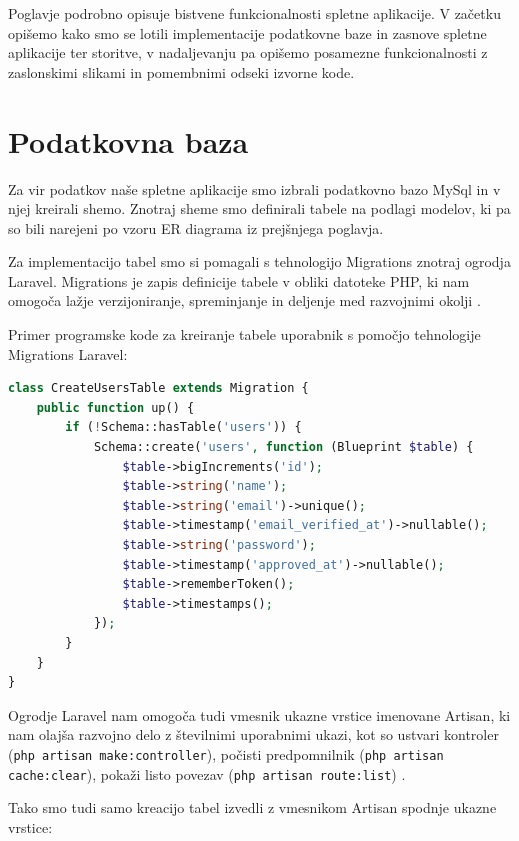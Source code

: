 \documentclass[a4paper, 12pt]{book}
\begin{document}
Poglavje podrobno opisuje bistvene funkcionalnosti spletne aplikacije. V začetku opišemo kako smo se lotili implementacije podatkovne baze in zasnove spletne aplikacije ter storitve, v nadaljevanju pa opišemo posamezne funkcionalnosti z zaslonskimi slikami in pomembnimi odseki izvorne kode.


\section{Podatkovna baza}

Za vir podatkov naše spletne aplikacije smo izbrali podatkovno bazo MySql in v njej kreirali shemo. Znotraj sheme smo definirali tabele na podlagi modelov, ki pa so bili narejeni po vzoru ER diagrama iz prejšnjega poglavja.
 
Za implementacijo tabel smo si pomagali s tehnologijo Migrations znotraj ogrodja Laravel. Migrations je zapis definicije tabele v obliki datoteke PHP, ki nam omogoča lažje verzijoniranje, spreminjanje in deljenje med razvojnimi okolji \cite{laravel-migrations}.

\clearpage

Primer programske kode za kreiranje tabele uporabnik s pomočjo tehnologije Migrations Laravel:

\begin{lstlisting}[language=PHP, style=mystyle]
class CreateUsersTable extends Migration {
    public function up() {
        if (!Schema::hasTable('users')) {
            Schema::create('users', function (Blueprint $table) {
                $table->bigIncrements('id');
                $table->string('name');
                $table->string('email')->unique();
                $table->timestamp('email_verified_at')->nullable();
                $table->string('password');
                $table->timestamp('approved_at')->nullable();
                $table->rememberToken();
                $table->timestamps();
            });
        }
    }
}
\end{lstlisting}

Ogrodje Laravel nam omogoča tudi vmesnik ukazne vrstice imenovane Artisan, ki nam olajša razvojno delo z številnimi uporabnimi ukazi, kot so ustvari kontroler (\verb=php artisan make:controller=), počisti predpomnilnik (\verb=php artisan cache:clear=), pokaži listo povezav (\verb=php artisan route:list=) \cite{laravel-artisan}.

Tako smo tudi samo kreacijo tabel izvedli z vmesnikom Artisan spodnje ukazne vrstice:
\end{document}
